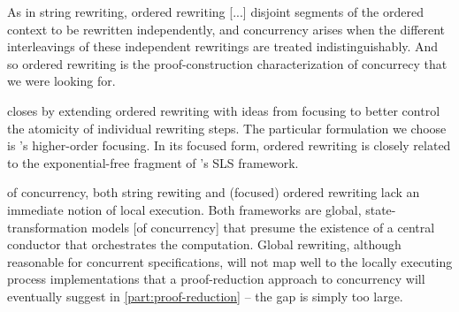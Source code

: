 As in string rewriting, ordered rewriting [...] disjoint segments of the ordered context to be rewritten independently, and concurrency arises when the different interleavings of these independent rewritings are treated indistinguishably.
And so ordered rewriting is the proof-construction characterization of concurrecy that we were looking for.

 closes by extending ordered rewriting with ideas from focusing\autocites{Andreoli:JLC92} to better control the atomicity of individual rewriting steps.
The particular formulation we choose is \citeauthor{Zeilberger:POPL08}'s higher-order focusing\autocite{Zeilberger:POPL08}.
In its focused form, ordered rewriting is closely related to the exponential-free fragment of \citeauthor{Simmons:CMU12}'s SLS framework.\autocite{Simmons:CMU12}





 of concurrency, both string rewiting and (focused) ordered rewriting lack an immediate notion of local execution.
Both frameworks are global, state-transformation models [of concurrency] that presume the existence of a central conductor that orchestrates the computation.
Global rewriting, although reasonable for concurrent specifications, will not map well to the locally executing process implementations that a proof-reduction approach to concurrency will eventually suggest in \cref{part:proof-reduction} -- the gap is simply too large.

